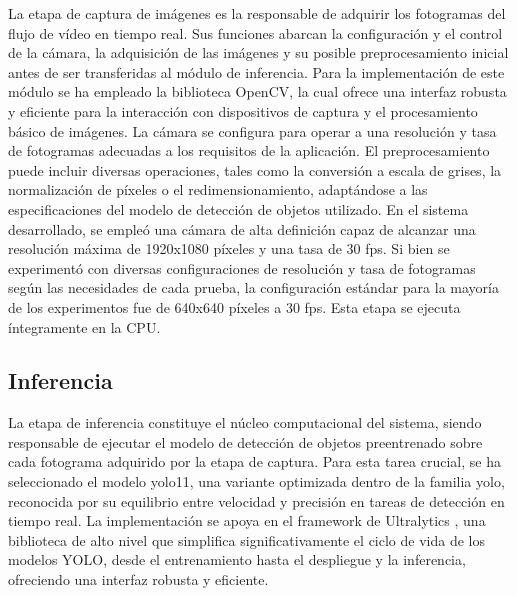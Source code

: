 \documentclass[11pt,spanish,listoffigures,listoftables]{tfgetsinf}
\begin{document}
La etapa de captura de imágenes es la responsable de adquirir los fotogramas del flujo de vídeo en tiempo real. Sus funciones abarcan la configuración y el control de la cámara, la adquisición de las imágenes y su posible preprocesamiento inicial antes de ser transferidas al módulo de inferencia. Para la implementación de este módulo se ha empleado la biblioteca OpenCV, la cual ofrece una interfaz robusta y eficiente para la interacción con dispositivos de captura y el procesamiento básico de imágenes. La cámara se configura para operar a una resolución y tasa de fotogramas adecuadas a los requisitos de la aplicación. El preprocesamiento puede incluir diversas operaciones, tales como la conversión a escala de grises, la normalización de píxeles o el redimensionamiento, adaptándose a las especificaciones del modelo de detección de objetos utilizado. En el sistema desarrollado, se empleó una cámara de alta definición capaz de alcanzar una resolución máxima de 1920x1080 píxeles y una tasa de 30 fps. Si bien se experimentó con diversas configuraciones de resolución y tasa de fotogramas según las necesidades de cada prueba, la configuración estándar para la mayoría de los experimentos fue de 640x640 píxeles a 30 fps. Esta etapa se ejecuta íntegramente en la CPU.

\subsection{Inferencia} \label{sec:inferencia}
La etapa de inferencia constituye el núcleo computacional del sistema, siendo responsable de ejecutar el modelo de detección de objetos preentrenado sobre cada fotograma adquirido por la etapa de captura. Para esta tarea crucial, se ha seleccionado el modelo \gls{yolo}11, una variante optimizada dentro de la familia \gls{yolo}, reconocida por su equilibrio entre velocidad y precisión en tareas de detección en tiempo real. La implementación se apoya en el framework de Ultralytics \cite{Jocher_Ultralytics_YOLO_2023}, una biblioteca de alto nivel que simplifica significativamente el ciclo de vida de los modelos YOLO, desde el entrenamiento hasta el despliegue y la inferencia, ofreciendo una interfaz robusta y eficiente.
\end{document}
